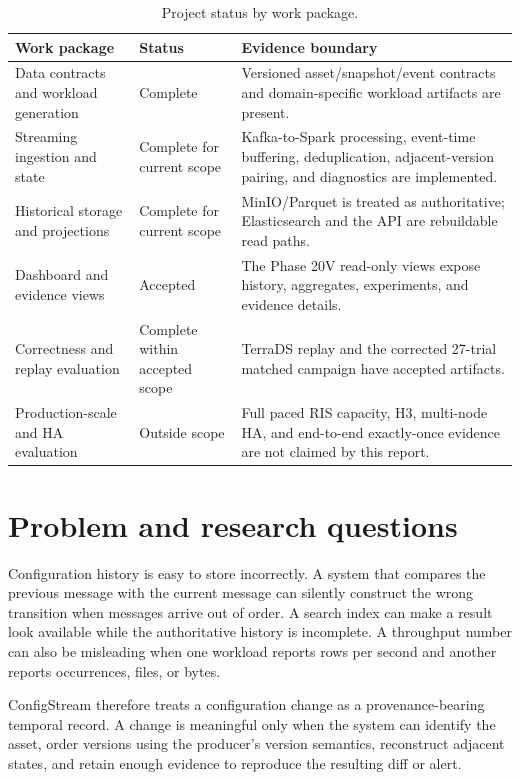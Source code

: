\documentclass[a4paper,11pt]{article}
\begin{document}
\begin{table}[ht]
\centering
\caption{Project status by work package.}
\label{tab:checkpoint-status}
\begin{tabularx}{\textwidth}{@{}p{}p{}X@{}}
\toprule
Work package & Status & Evidence boundary \\
\midrule
Data contracts and workload generation & Complete & Versioned asset/snapshot/event contracts and domain-specific workload artifacts are present. \\
Streaming ingestion and state & Complete for current scope & Kafka-to-Spark processing, event-time buffering, deduplication, adjacent-version pairing, and diagnostics are implemented. \\
Historical storage and projections & Complete for current scope & MinIO/Parquet is treated as authoritative; Elasticsearch and the API are rebuildable read paths. \\
Dashboard and evidence views & Accepted & The Phase 20V read-only views expose history, aggregates, experiments, and evidence details. \\
Correctness and replay evaluation & Complete within accepted scope & TerraDS replay and the corrected 27-trial matched campaign have accepted artifacts. \\
Production-scale and HA evaluation & Outside scope & Full paced RIS capacity, H3, multi-node HA, and end-to-end exactly-once evidence are not claimed by this report. \\
\bottomrule
\end{tabularx}
\end{table}

\section{Problem and research questions}

Configuration history is easy to store incorrectly. A system that compares the previous message with the current message can silently construct the wrong transition when messages arrive out of order. A search index can make a result look available while the authoritative history is incomplete. A throughput number can also be misleading when one workload reports rows per second and another reports occurrences, files, or bytes.

ConfigStream therefore treats a configuration change as a provenance-bearing temporal record. A change is meaningful only when the system can identify the asset, order versions using the producer's version semantics, reconstruct adjacent states, and retain enough evidence to reproduce the resulting diff or alert.
\end{document}
